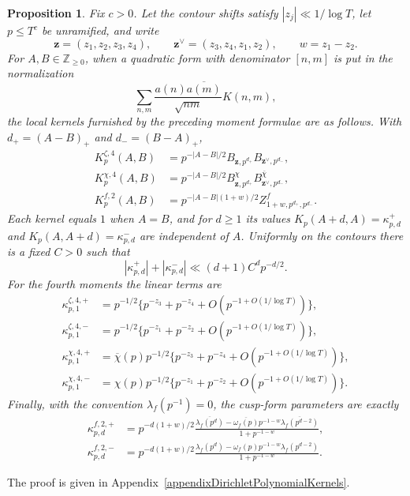 \documentclass[oneside, 12pt]{amsart}
\newtheorem{prop}[thm]{Proposition}
\theoremstyle{definition}
\begin{document}
	{
		\begin{prop}\label{verificationOfTwistedLocalKernels}
			{Fix $c>0$.  Let the contour shifts satisfy
				$|z_j|\ll1/\log T$, let $p\leq T^c$ be unramified, and write
				\[
				\mathbf z=(z_1,z_2,z_3,z_4),\qquad
				\mathbf z^\vee=(z_3,z_4,z_1,z_2),\qquad
				w=z_1-z_2.
				\]
				For $A,B\in\mathbb Z_{\geq0}$, when a quadratic form with denominator
				$[n,m]$ is put in the
				normalization
				\[
				\sum_{n,m}\frac{a(n)\overline{a(m)}}{\sqrt{nm}}K(n,m),
				\]
				the local kernels furnished by the preceding moment formulae are as
				follows.  With $d_+=(A-B)_+$ and $d_-=(B-A)_+$,
				\begin{align}
					K_p^{\zeta,4}(A,B)
					&=p^{-|A-B|/2}B_{\mathbf z,p^{d_+}}
					B_{\mathbf z^\vee,p^{d_-}},
					\label{zetaFourthLocalKernel}\\
					K_p^{\chi,4}(A,B)
					&=p^{-|A-B|/2}B^\chi_{\mathbf z,p^{d_+}}
					B^{\overline\chi}_{\mathbf z^\vee,p^{d_-}},
					\label{characterFourthLocalKernel}\\
					K_p^{f,2}(A,B)
					&=p^{-|A-B|(1+w)/2}
					Z^f_{1+w,p^{d_+},p^{d_-}}.
					\label{cuspSecondLocalKernel}
				\end{align}
				Each kernel equals $1$ when $A=B$, and for $d\geq1$ its values
				$K_p(A+d,A)=\kappa^+_{p,d}$ and
				$K_p(A,A+d)=\kappa^-_{p,d}$ are independent of $A$.  Uniformly on the
				contours there is a fixed $C>0$ such that
				\begin{equation}\label{verifiedKappaBound}
					|\kappa^+_{p,d}|+|\kappa^-_{p,d}|
					\ll(d+1)C^dp^{-d/2}.
				\end{equation}
				For the fourth moments the linear terms are
				\begin{align}
					\kappa^{\zeta,4,+}_{p,1}
					&=p^{-1/2}\{p^{-z_3}+p^{-z_4}
					+O(p^{-1+O(1/\log T)})\},\nonumber\\
					\kappa^{\zeta,4,-}_{p,1}
					&=p^{-1/2}\{p^{-z_1}+p^{-z_2}
					+O(p^{-1+O(1/\log T)})\},
					\label{zetaLinearLocalTerms}\\
					\kappa^{\chi,4,+}_{p,1}
					&=\overline\chi(p)p^{-1/2}\{p^{-z_3}+p^{-z_4}
					+O(p^{-1+O(1/\log T)})\},\nonumber\\
					\kappa^{\chi,4,-}_{p,1}
					&=\chi(p)p^{-1/2}\{p^{-z_1}+p^{-z_2}
					+O(p^{-1+O(1/\log T)})\}.
					\label{characterLinearLocalTerms}
				\end{align}
				Finally, with the convention $\lambda_f(p^{-1})=0$, the cusp-form
				parameters are exactly
				\begin{align}
					\kappa^{f,2,+}_{p,d}
					&=p^{-d(1+w)/2}
					\frac{\overline{\lambda_f(p^d)}-
						\overline{\omega_f(p)}p^{-1-w}
						\overline{\lambda_f(p^{d-2})}}{1+p^{-1-w}},
					\label{cuspPlusKappa}\\
					\kappa^{f,2,-}_{p,d}
					&=p^{-d(1+w)/2}
					\frac{\lambda_f(p^d)-\omega_f(p)p^{-1-w}
						\lambda_f(p^{d-2})}{1+p^{-1-w}}.
					\label{cuspMinusKappa}
			\end{align}}
		\end{prop}
		
		{The proof is given in
			Appendix~\ref{appendixDirichletPolynomialKernels}.}
	}
	
\end{document}
